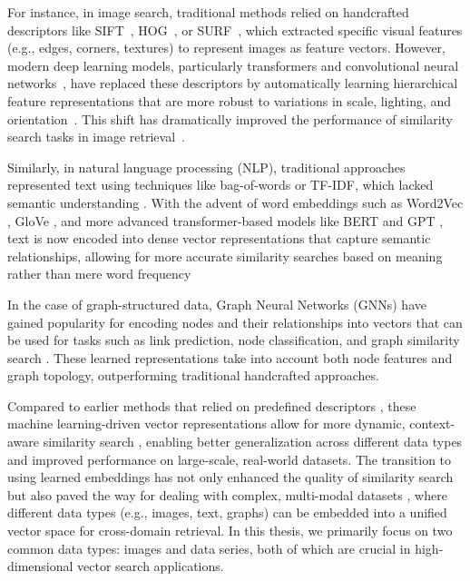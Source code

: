 For instance, in image search, traditional methods relied on handcrafted descriptors like SIFT~\cite{sift,sift1}, HOG~\cite{hog}, or SURF~\cite{surf}, which extracted specific visual features (e.g., edges, corners, textures) to represent images as feature vectors. However, modern deep learning models, particularly transformers and  convolutional neural networks~\cite{cnn,cnn1, transf1,transf2}, have replaced these descriptors by automatically learning hierarchical feature representations that are more robust to variations in scale, lighting, and orientation~\cite{lemb1,cnn2,lemb,transf}. This shift has dramatically improved the performance of similarity search tasks in image retrieval~\cite{amazon,faiss,nsg,aumuller2017ann}.

Similarly, in natural language processing (NLP), traditional approaches represented text using techniques like bag-of-words or TF-IDF, which lacked semantic understanding \cite{Manning2008}. With the advent of word embeddings such as Word2Vec \cite{Mikolov2013}, GloVe \cite{Pennington2014}, and more advanced transformer-based models like BERT \cite{Devlin2019} and GPT \cite{Radford2018}, text is now encoded into dense vector representations that capture semantic relationships, allowing for more accurate similarity searches based on meaning rather than mere word frequency

In the case of graph-structured data, Graph Neural Networks (GNNs) have gained popularity for encoding nodes and their relationships into vectors that can be used for tasks such as link prediction, node classification, and graph similarity search \cite{Scarselli2009, Kipf2017, Hamilton2017}. These learned representations take into account both node features and graph topology, outperforming traditional handcrafted approaches.

Compared to earlier methods that relied on predefined descriptors \cite{Lowe2004, Dalal2005}, these machine learning-driven vector representations allow for more dynamic, context-aware similarity search \cite{Krizhevsky2012, Mikolov2013a}, enabling better generalization across different data types and improved performance on large-scale, real-world datasets. The transition to using learned embeddings has not only enhanced the quality of similarity search but also paved the way for dealing with complex, multi-modal datasets \cite{Ngiam2011, Radford2021}, where different data types (e.g., images, text, graphs) can be embedded into a unified vector space for cross-domain retrieval.
In this thesis, we primarily focus on two common data types: images and data series, both of which are crucial in high-dimensional vector search applications.

